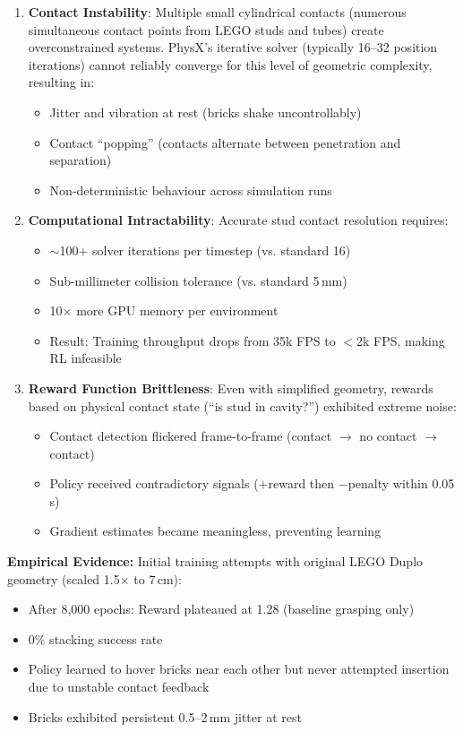 \documentclass[12pt,a4paper,oneside]{report}
\begin{document}
\begin{enumerate}
    \item \textbf{Contact Instability}: Multiple small cylindrical contacts (numerous simultaneous contact points from LEGO studs and tubes) create overconstrained systems. PhysX's iterative solver (typically 16--32 position iterations) cannot reliably converge for this level of geometric complexity, resulting in:
    \begin{itemize}
        \item Jitter and vibration at rest (bricks shake uncontrollably)
        \item Contact ``popping'' (contacts alternate between penetration and separation)
        \item Non-deterministic behaviour across simulation runs
    \end{itemize}

    \item \textbf{Computational Intractability}: Accurate stud contact resolution requires:
    \begin{itemize}
        \item $\sim$100+ solver iterations per timestep (vs. standard 16)
        \item Sub-millimeter collision tolerance (vs. standard 5\,mm)
        \item 10$\times$ more GPU memory per environment
        \item Result: Training throughput drops from 35k FPS to $<$2k FPS, making RL infeasible
    \end{itemize}

    \item \textbf{Reward Function Brittleness}: Even with simplified geometry, rewards based on physical contact state (``is stud in cavity?'') exhibited extreme noise:
    \begin{itemize}
        \item Contact detection flickered frame-to-frame (contact $\rightarrow$ no contact $\rightarrow$ contact)
        \item Policy received contradictory signals ($+$reward then $-$penalty within 0.05\,s)
        \item Gradient estimates became meaningless, preventing learning
    \end{itemize}
\end{enumerate}

\textbf{Empirical Evidence:}
Initial training attempts with original LEGO Duplo geometry (scaled 1.5$\times$ to 7\,cm):
\begin{itemize}
    \item After 8{,}000 epochs: Reward plateaued at 1.28 (baseline grasping only)
    \item 0\% stacking success rate
    \item Policy learned to hover bricks near each other but never attempted insertion due to unstable contact feedback
    \item Bricks exhibited persistent 0.5--2\,mm jitter at rest
\end{itemize}
\end{document}
